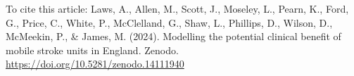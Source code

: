 \documentclass{article}
\begin{document}

\maketitle
\begin{refsection} %

To cite this article: Laws, A., Allen, M., Scott, J., Moseley, L., Pearn, K., Ford, G., Price, C., White, P., McClelland, G., Shaw, L., Phillips, D., Wilson, D., McMeekin, P., \& James, M. (2024). Modelling the potential clinical benefit of mobile stroke units in England. Zenodo. \url{https://doi.org/10.5281/zenodo.14111940}





\clearpage
\newpage
\printbibliography
\end{refsection}


\newcommand{\beginsupplement}{
    \setcounter{section}{0}
    \renewcommand{\thesection}{S\arabic{section}}
    \setcounter{figure}{0}
    \renewcommand{\thefigure}{S\arabic{figure}}
    \setcounter{table}{0}
    \renewcommand{\thetable}{S\arabic{table}}

}
\begin{refsection} %
\beginsupplement

%
\printbibliography[title={References for supplementary material}]
\end{refsection}
\end{document}
